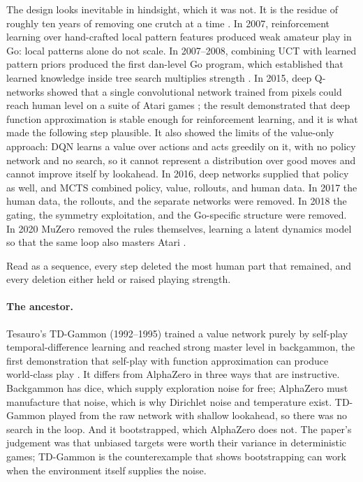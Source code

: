 The design looks inevitable in hindsight, which it was not. It is the residue of
roughly ten years of removing one crutch at a time \citep{silver2009thesis}.
In 2007, reinforcement learning over hand-crafted local pattern features produced
weak amateur play in Go: local patterns alone do not scale. In 2007--2008,
combining UCT with learned pattern priors produced the first dan-level Go
program, which established that learned knowledge inside tree search multiplies
strength \citep{gelly2007rave}. In 2015, deep Q-networks showed that a single
convolutional network trained from pixels could reach human level on a suite of
Atari games \citep{mnih2015dqn}; the result demonstrated that deep function
approximation is stable enough for reinforcement learning, and it is what made
the following step plausible. It also showed the limits of the value-only
approach: DQN learns a value over actions and acts greedily on it, with no policy
network and no search, so it cannot represent a distribution over good moves and
cannot improve itself by lookahead. In 2016, deep networks supplied that policy
as well, and MCTS combined policy, value, rollouts, and human data. In 2017 the
human data, the rollouts, and the separate networks were removed. In 2018 the
gating, the symmetry exploitation, and the Go-specific structure were removed. In
2020 MuZero removed the rules themselves, learning a latent dynamics model so
that the same loop also masters Atari \citep{schrittwieser2020muzero}.

Read as a sequence, every step deleted the most human part that remained, and
every deletion either held or raised playing strength.

\paragraph{The ancestor.} Tesauro's TD-Gammon (1992--1995) trained a value
network purely by self-play temporal-difference learning and reached strong
master level in backgammon, the first demonstration that self-play with function
approximation can produce world-class play \citep{tesauro1995tdgammon}. It differs
from AlphaZero in three ways that are instructive. Backgammon has dice, which
supply exploration noise for free; AlphaZero must manufacture that noise, which
is why Dirichlet noise and temperature exist. TD-Gammon played from the raw
network with shallow lookahead, so there was no search in the loop. And it
bootstrapped, which AlphaZero does not. The paper's judgement was that unbiased
targets were worth their variance in deterministic games; TD-Gammon is the
counterexample that shows bootstrapping can work when the environment itself
supplies the noise.
